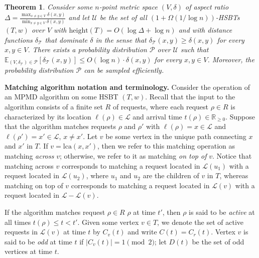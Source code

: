 \documentclass[11pt]{article}
\def\LongVersion{}
\def\LongVersionEnd{}
\def\ShortVersion{}
\def\ShortVersionEnd{}
\renewcommand{\paragraph}[1]{\par\noindent\textbf{#1}}
\newtheorem{theorem}{Theorem}[section]
\theoremstyle{definition}
\theoremstyle{plain}
\newtheorem{theorem}{Theorem}
\theoremstyle{definition}
\theoremstyle{plain}
\newtheorem{theorem}{Theorem}[section]
\theoremstyle{definition}
\theoremstyle{plain}
\newcommand{\NotationLabel}[1]{\label{notationTable:#1}\ignorespaces}
\newcommand{\Location}{\ell}
\newcommand{\aTime}{\mathit{t}}
\newcommand{\Reals}{\mathbb{R}}
\newcommand{\Expect}{\mathbb{E}}
\newcommand{\Leaves}{\mathcal{L}}
\newcommand{\LCA}{\mathrm{lca}}
\newcommand{\Height}{\mathrm{height}}
\newcommand{\Active}{\mathit{C}}
\newcommand{\Odd}{\mathit{D}}
\begin{document}
\begin{theorem} \label{theorem:HSBT}
Consider some $n$-point metric space
$(V, \delta)$
of aspect ratio
$\Delta = \frac{\max_{x \neq y \in V} \delta(x, y)}{\min_{x \neq y \in V}
\delta(x, y)}$
and let $\mathcal{U}$ be the set of all $(1 + \Omega (1 / \log n))$-HSBTs
$(T, w)$
over $V$ with
$\Height(T) = O (\log \Delta + \log n)$
and with
distance functions $\delta_{\mathcal{T}}$ that dominate $\delta$ in the sense that
$\delta_{\mathcal{T}}(x, y) \geq \delta(x, y)$
for every $x, y \in V$.
There exists a probability distribution $\mathcal{P}$ over $\mathcal{U}$ such
that
$\Expect_{(V, \delta_{\mathcal{T}}) \in \mathcal{P}}[\delta_{\mathcal{T}}(x, y)]
\leq
O (\log n) \cdot \delta(x, y)$
for every $x, y \in V$.
Moreover, the probability distribution $\mathcal{P}$ can be sampled
efficiently.
\end{theorem}

\paragraph{Matching algorithm notation and terminology.}
Consider the operation of an MPMD algorithm on some HSBT $(T, w)$.
\LongVersion %
Recall that the input to the algorithm consists of a finite set $R$ of
requests, where each request
$\rho \in R$
is characterized by its location
$\Location(\rho) \in \Leaves$
and arrival time
$\aTime(\rho) \in \Reals_{\geq 0}$.
\LongVersionEnd %
Suppose that the algorithm matches requests $\rho$ and $\rho'$ with
$\Location(\rho) = x \in \Leaves$
and
$\Location(\rho') = x' \in \Leaves$,
$x \neq x'$.
Let $v$ be some vertex in the unique path connecting $x$ and $x'$ in $T$.
If
$v = \LCA(x, x')$,
then we refer to this matching operation as matching \emph{across} $v$;
otherwise, we refer to it as matching \emph{on top of} $v$.
Notice that matching across $v$ corresponds to matching a request located in
$\Leaves(u_{1})$ with a request located in $\Leaves(u_{2})$, where $u_{1}$ and
$u_{2}$ are the children of $v$ in $T$, whereas matching on top of $v$
corresponds to matching a request located in $\Leaves(v)$ with a request
located in $\Leaves - \Leaves(v)$.

If the algorithm matches request
\LongVersion %
$\rho \in R$
\LongVersionEnd %
%
\ShortVersion %
$\rho$
\ShortVersionEnd %
at time $t'$, then $\rho$ is said to be \emph{active} at all times
$\aTime(\rho) \leq t < t'$.
Given some vertex $v \in T$, we denote the set of active requests in
$\Leaves(v)$ at time $t$ by
$\Active_{v}(t)$
\NotationLabel{alg:active}
and write
$\Active(t) = \Active_{r}(t)$.
\NotationLabel{alg:active-root}
Vertex $v$ is said to be \emph{odd} at time $t$ if
$|\Active_{v}(t)| = 1 \pmod{2}$;
let
$\Odd(t)$
\NotationLabel{alg:odd}
be the set of odd vertices at time $t$.
\end{document}
